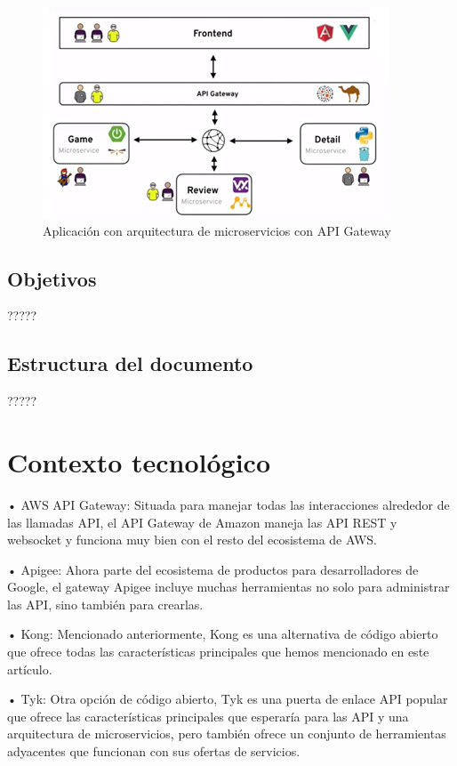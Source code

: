 \documentclass[11pt,spanish,listoffigures]{tfgetsinf}
\begin{document}
\begin{figure}
	\centering
	\includegraphics{images/arquitecturaMicroserviciosConGateway}
	\caption{Aplicación con arquitectura de microservicios con API Gateway}
\end{figure}

\section{Objetivos}

?????

\section{Estructura del documento}

?????


\chapter{Contexto tecnológico}

•	AWS API Gateway: Situada para manejar todas las interacciones alrededor de las llamadas API, el API Gateway de Amazon maneja las API REST y websocket y funciona muy bien con el resto del ecosistema de AWS.

•	Apigee: Ahora parte del ecosistema de productos para desarrolladores de Google, el gateway Apigee incluye muchas herramientas no solo para administrar las API, sino también para crearlas.

•	Kong: Mencionado anteriormente, Kong es una alternativa de código abierto que ofrece todas las características principales que hemos mencionado en este artículo.

•	Tyk: Otra opción de código abierto, Tyk es una puerta de enlace API popular que ofrece las características principales que esperaría para las API y una arquitectura de microservicios, pero también ofrece un conjunto de herramientas adyacentes que funcionan con sus ofertas de servicios.
\end{document}
